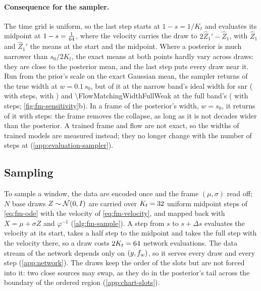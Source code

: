 \paragraph{Consequence for the sampler.}
The time grid is uniform, so the last step starts at $1-s = 1/K_t$ and evaluates its midpoint at
$1-s = \tfrac{1}{64}{}$, where the velocity carries the draw to $2\hat Z_1' - \hat Z_1$, with
$\hat Z_1$ and $\hat Z_1'$ the means at the start and the midpoint. Where a posterior is much
narrower than $s_0/2K_t$, the exact means at both points hardly vary across draws: they are close to
the posterior mean, and the last step puts every draw near it. Run from the prior's scale on the
exact Gaussian mean, the sampler returns \FlowMatchingWidthWide{} of the true width at $w = 0.1\,s_0$,
but \FlowMatchingWidthNarrowWeak{} of it at the narrow band's ideal width for \ac{snr}
\FlowMatchingSnrLow{} (\FlowMatchingWidthNarrowWeakMore{} with \FlowMatchingOdeStepsMore{} steps,
\FlowMatchingWidthNarrowWeakMost{} with \FlowMatchingOdeStepsMost{}) and
\num{\FlowMatchingWidthFullWeak} at the full band's (\FlowMatchingWidthFullWeakMost{} with
\FlowMatchingOdeStepsMost{} steps; \cref{fig:fm-sensitivity}b). In a frame of the posterior's width,
$w = s_0$, it returns \FlowMatchingWidthFrame{} of it with \FlowMatchingOdeSteps{} steps: the frame
removes the collapse, as long as it is not decades wider than the posterior. A trained frame and
flow are not exact, so the widths of trained models are measured instead; they no longer change
with the number of steps at \FlowMatchingOdeSteps{} (\cref{app:evaluation-sampler}).

\subsection{Sampling}
\label{app:fm-sampling}

To sample a window, the data are encoded once and the frame $(\mu,\sigma)$ read off; $N$ base draws
$Z\sim\mathcal{N}(0,I)$ are carried over $K_t = 32{}$ uniform midpoint steps of
\cref{eq:fm-ode} with the velocity of \cref{eq:fm-velocity}, and mapped back with $X = \mu + \sigma
Z$ and $\varphi^{-1}$ (\cref{alg:fm-sample}). A step from $s$ to $s+\Delta s$ evaluates the velocity
at its start, takes a half step to the midpoint and takes the full step with the velocity there, so
a draw costs $2K_t=64{}$ network evaluations. The data stream of the network
depends only on $(y,f_{w})$, so it serves every draw and every step (\cref{app:network}). The draws
keep the order of the slots but are not forced into it: two close sources may swap, as they do in
the posterior's tail across the boundary of the ordered region (\cref{app:chart-slots}).

